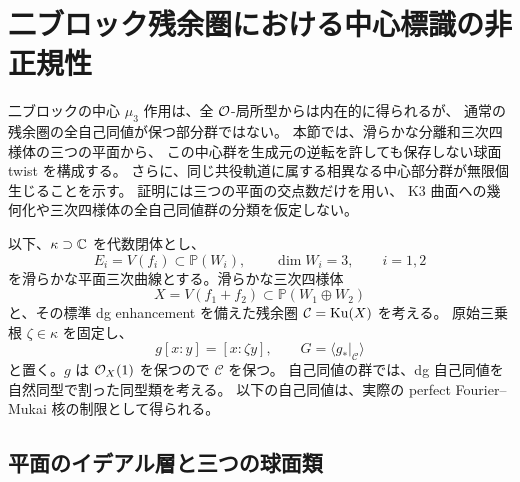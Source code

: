 \section{二ブロック残余圏における中心標識の非正規性}
\label{mbun:sec:unmarked}

二ブロックの中心 $\mu_3$ 作用は、全 $\mathcal O$-局所型からは内在的に得られるが、
通常の残余圏の全自己同値が保つ部分群ではない。
本節では、滑らかな分離和三次四様体の三つの平面から、
この中心群を生成元の逆転を許しても保存しない球面 twist を構成する。
さらに、同じ共役軌道に属する相異なる中心部分群が無限個生じることを示す。
証明には三つの平面の交点数だけを用い、
K3 曲面への幾何化や三次四様体の全自己同値群の分類を仮定しない。

以下、$\kappa\supset\mathbb C$ を代数閉体とし、
\[
 E_i=V(f_i)\subset\mathbb P(W_i),\qquad \dim W_i=3,\qquad i=1,2
\]
を滑らかな平面三次曲線とする。滑らかな三次四様体
\[
 X=V(f_1+f_2)\subset\mathbb P(W_1\oplus W_2)
\]
と、その標準 dg enhancement を備えた残余圏 $\mathcal C=\operatorname{Ku}(X)$ を考える。
原始三乗根 $\zeta\in\kappa$ を固定し、
\begin{equation}\label{mbun:eq:block-action}
 g[x:y]=[x:\zeta y],\qquad
 G=\langle g_*|_{\mathcal C}\rangle
\end{equation}
と置く。$g$ は $\mathcal O_X(1)$ を保つので $\mathcal C$ を保つ。
自己同値の群では、dg 自己同値を自然同型で割った同型類を考える。
以下の自己同値は、実際の perfect Fourier--Mukai 核の制限として得られる。

\subsection{平面のイデアル層と三つの球面類}

